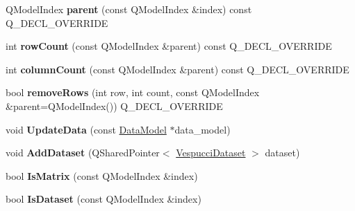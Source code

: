 \begin{DoxyCompactItemize}
\item 
Q\+Model\+Index {\bfseries parent} (const Q\+Model\+Index \&index) const Q\+\_\+\+D\+E\+C\+L\+\_\+\+O\+V\+E\+R\+R\+I\+DE\hypertarget{class_dataset_tree_model_a0632356b4a79219f07957f0934dce29a}{}\label{class_dataset_tree_model_a0632356b4a79219f07957f0934dce29a}

\item 
int {\bfseries row\+Count} (const Q\+Model\+Index \&parent) const Q\+\_\+\+D\+E\+C\+L\+\_\+\+O\+V\+E\+R\+R\+I\+DE\hypertarget{class_dataset_tree_model_ad88f002ac8bc88099867ff68d19d383e}{}\label{class_dataset_tree_model_ad88f002ac8bc88099867ff68d19d383e}

\item 
int {\bfseries column\+Count} (const Q\+Model\+Index \&parent) const Q\+\_\+\+D\+E\+C\+L\+\_\+\+O\+V\+E\+R\+R\+I\+DE\hypertarget{class_dataset_tree_model_a731a037c013492069bc701824fe7155c}{}\label{class_dataset_tree_model_a731a037c013492069bc701824fe7155c}

\item 
bool {\bfseries remove\+Rows} (int row, int count, const Q\+Model\+Index \&parent=Q\+Model\+Index()) Q\+\_\+\+D\+E\+C\+L\+\_\+\+O\+V\+E\+R\+R\+I\+DE\hypertarget{class_dataset_tree_model_ae7707a7eca291896295e238809016d77}{}\label{class_dataset_tree_model_ae7707a7eca291896295e238809016d77}

\item 
void {\bfseries Update\+Data} (const \hyperlink{class_data_model}{Data\+Model} $\ast$data\+\_\+model)\hypertarget{class_dataset_tree_model_a2e05e6b5953aad5921a29e643f977c53}{}\label{class_dataset_tree_model_a2e05e6b5953aad5921a29e643f977c53}

\item 
void {\bfseries Add\+Dataset} (Q\+Shared\+Pointer$<$ \hyperlink{class_vespucci_dataset}{Vespucci\+Dataset} $>$ dataset)\hypertarget{class_dataset_tree_model_ac43ddd0aefecc9434dabce31728e8d7d}{}\label{class_dataset_tree_model_ac43ddd0aefecc9434dabce31728e8d7d}

\item 
bool {\bfseries Is\+Matrix} (const Q\+Model\+Index \&index)\hypertarget{class_dataset_tree_model_acff63b8d7b909efa12869d836e855aa4}{}\label{class_dataset_tree_model_acff63b8d7b909efa12869d836e855aa4}

\item 
bool {\bfseries Is\+Dataset} (const Q\+Model\+Index \&index)\hypertarget{class_dataset_tree_model_a4f32fc47d886e44b34a77778d07df8b2}{}\label{class_dataset_tree_model_a4f32fc47d886e44b34a77778d07df8b2}


\end{DoxyCompactItemize}
